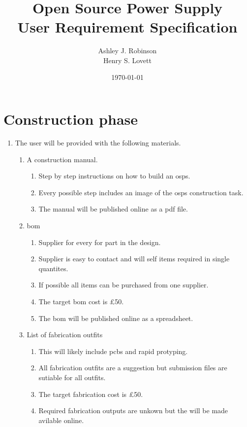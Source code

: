 \documentclass[12pt,a4paper]{article}
\title{Open Source Power Supply\\ User Requirement Specification}
\author{Ashley J. Robinson \\ Henry S. Lovett}
\date{\today}
\begin{document}
\maketitle



\section{Construction phase}
\begin{enumerate}[label*=\arabic*.]
\item The user will be provided with the following materials.
	\begin{enumerate}[label*=\arabic*.]
	\item A construction manual.
		\begin{enumerate}[label*=\arabic*.]
		\item Step by step instructions on how to build an \gls{osps}.
		\item Every possible step includes an image of the \gls{osps} construction task. 
		\item The manual will be published online as a pdf file.
		\end{enumerate}
	\item \gls{bom}
		\begin{enumerate}[label*=\arabic*.]
		\item Supplier for every for part in the design.
		\item Supplier is easy to contact and will self items required in single quantites.
		\item If possible all items can be purchased from one supplier.
		\item The target \gls{bom} cost is \pounds50.
		\item The \gls{bom} will be published online as a spreadsheet.
		\end{enumerate}
	\item List of fabrication outfits
		\begin{enumerate}[label*=\arabic*.]
		\item This will likely include \glspl{pcb} and rapid protyping.
		\item All fabrication outfits are a suggestion but submission files are sutiable for all outfits.
		\item The target fabrication cost is \pounds50.
		\item Required fabrication outputs are unkown but the will be made avilable online.
		\end{enumerate}

\end{enumerate}
\end{enumerate}
\end{document}

